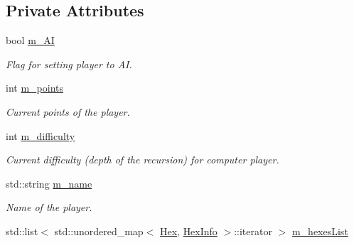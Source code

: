 \subsection*{Private Attributes}
\begin{DoxyCompactItemize}
\item 
bool \hyperlink{classPlayer_a4e71a5aa397a446e2aa4a8c8b087416d}{m\+\_\+\+AI}\hypertarget{classPlayer_a4e71a5aa397a446e2aa4a8c8b087416d}{}\label{classPlayer_a4e71a5aa397a446e2aa4a8c8b087416d}

\begin{DoxyCompactList}\small\item\em Flag for setting player to AI. \end{DoxyCompactList}\item 
int \hyperlink{classPlayer_af40b202e39d34b244b882aeead951552}{m\+\_\+points}\hypertarget{classPlayer_af40b202e39d34b244b882aeead951552}{}\label{classPlayer_af40b202e39d34b244b882aeead951552}

\begin{DoxyCompactList}\small\item\em Current points of the player. \end{DoxyCompactList}\item 
int \hyperlink{classPlayer_a1c837a997ed609bc7934bb2a610d8092}{m\+\_\+difficulty}\hypertarget{classPlayer_a1c837a997ed609bc7934bb2a610d8092}{}\label{classPlayer_a1c837a997ed609bc7934bb2a610d8092}

\begin{DoxyCompactList}\small\item\em Current difficulty (depth of the recursion) for computer player. \end{DoxyCompactList}\item 
std\+::string \hyperlink{classPlayer_add634962cf5d664d2f7616af00082d80}{m\+\_\+name}\hypertarget{classPlayer_add634962cf5d664d2f7616af00082d80}{}\label{classPlayer_add634962cf5d664d2f7616af00082d80}

\begin{DoxyCompactList}\small\item\em Name of the player. \end{DoxyCompactList}\item 
std\+::list$<$ std\+::unordered\+\_\+map$<$ \hyperlink{classHex}{Hex}, \hyperlink{structHexInfo}{Hex\+Info} $>$\+::iterator $>$ \hyperlink{classPlayer_a0726bfedf6ae4656f9fe07e5da6afb8a}{m\+\_\+hexes\+List}\hypertarget{classPlayer_a0726bfedf6ae4656f9fe07e5da6afb8a}{}\label{classPlayer_a0726bfedf6ae4656f9fe07e5da6afb8a}


\end{DoxyCompactItemize}

